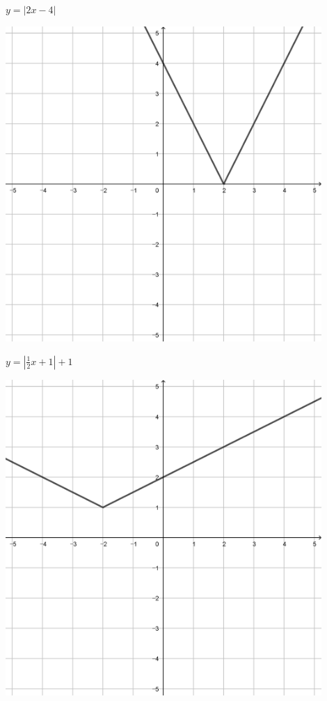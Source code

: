 \documentclass[a4paper]{oblivoir}
\begin{document}
\begin{minipage}{0.45\textwidth}\centering
\(y=|2x-4|\)
\par\bigskip\includegraphics[width=0.9\textwidth]{img/3_piecewise_23}
\end{minipage}
\begin{minipage}{0.45\textwidth}\centering
\(y=|\frac12x+1|+1\)
\par\bigskip\includegraphics[width=0.9\textwidth]{img/3_piecewise_24}
\end{minipage}\bigskip\bigskip\par
\end{document}
